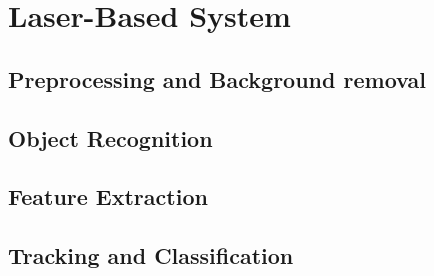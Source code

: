 
\chapter{Laser-Based System}

\section{Preprocessing and Background removal}
\section{Object Recognition}
\section{Feature Extraction}
\section{Tracking and Classification}
